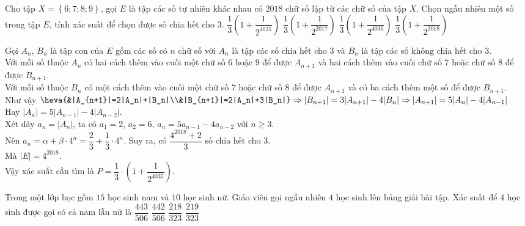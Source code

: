 \begin{ex}%
	Cho tập $X=\left\{6; 7; 8; 9\right\}$, gọi $E$ là tập các số tự nhiên khác nhau có $2018$ chữ số lập từ các chữ số của tập $X$. Chọn ngẫu nhiên một số trong tập $E$, tính xác suất để chọn được số chia hết cho $3$.
	\choice
	{\True $\dfrac{1}{3}\left(1+\dfrac{1}{2^{4035}}\right)$}
	{$\dfrac{1}{3}\left(1+\dfrac{1}{2^{2017}}\right)$}
	{$\dfrac{1}{3}\left(1+\dfrac{1}{2^{4036}}\right)$}
	{$\dfrac{1}{3}\left(1+\dfrac{1}{2^{2018}}\right)$}
	\loigiai
	{Gọi $A_n$, $B_n$ là tập con của $E$ gồm các số có $n$ chữ số với $A_n$ là tập các số chia hết cho $3$ và $B_n$ là tập các số không chia hết cho $3$.\\
		Với mỗi số thuộc $A_n$ có hai cách thêm vào cuối một chữ số $6$ hoặc $9$ để được $A_{n+1}$ và hai cách thêm vào cuối chữ số $7$ hoặc chữ số $8$ để được $B_{n+1}$.\\
		Với mỗi số thuộc $B_n$ có một cách thêm vào cuối một chữ số $7$ hoặc chữ số $8$ để được $A_{n+1}$ và có ba cách thêm một số để được $B_{n+1}$.\\
		Như vậy $\heva{&|A_{n+1}|=2|A_n|+|B_n|\\&|B_{n+1}|=2|A_n|+3|B_n|}\Rightarrow |B_{n+1}|=3|A_{n+1}|-4|B_n|\Rightarrow |A_{n+1}|=5|A_n|-4|A_{n-1}|$.\\
		Hay $|A_n|=5|A_{n-1}|-4|A_{n-2}|$.\\
		Xét dãy $a_n=|A_n|$, ta có $a_1=2$, $a_2=6$, $a_n=5a_{n-1}-4a_{n-2}$ với $n\geq 3$.\\
		Nên $a_n=\alpha+\beta \cdot 4^n=\dfrac{2}{3}+\dfrac{1}{3}\cdot 4^n$. Suy ra, có $\dfrac{4^{2018}+2}{3}$ số chia hết cho $3$.\\
		Mà $|E|=4^{2018}$.\\
		Vậy xác suất cần tìm là $P=\dfrac{1}{3}\cdot \left(1+\dfrac{1}{2^{4035}}\right)$.
		
	}
\end{ex}%
\begin{ex}%
	Trong một lớp học gồm $15$ học sinh nam và $10$ học sinh nữ. Giáo viên gọi ngẫu nhiên $4$ học sinh lên bảng giải bài tập. Xác suất để $4$ học sinh được gọi có cả nam lẫn nữ là
	\choice
	{\True $\dfrac{443}{506}$}
	{$\dfrac{442}{506}$}
	{$\dfrac{218}{323}$}
	{$\dfrac{219}{323}$}
\end{ex}%
